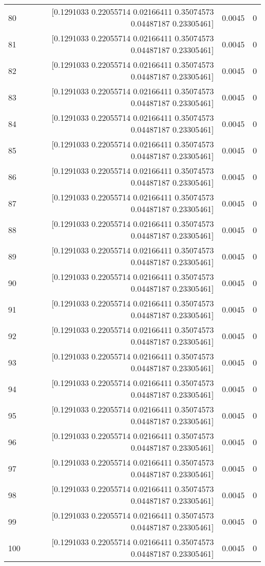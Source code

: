 \begin{longtable}{lrrr}
80 & [0.1291033  0.22055714 0.02166411 0.35074573 0.04487187 0.23305461] & 0.0045 & 0 \\
81 & [0.1291033  0.22055714 0.02166411 0.35074573 0.04487187 0.23305461] & 0.0045 & 0 \\
82 & [0.1291033  0.22055714 0.02166411 0.35074573 0.04487187 0.23305461] & 0.0045 & 0 \\
83 & [0.1291033  0.22055714 0.02166411 0.35074573 0.04487187 0.23305461] & 0.0045 & 0 \\
84 & [0.1291033  0.22055714 0.02166411 0.35074573 0.04487187 0.23305461] & 0.0045 & 0 \\
85 & [0.1291033  0.22055714 0.02166411 0.35074573 0.04487187 0.23305461] & 0.0045 & 0 \\
86 & [0.1291033  0.22055714 0.02166411 0.35074573 0.04487187 0.23305461] & 0.0045 & 0 \\
87 & [0.1291033  0.22055714 0.02166411 0.35074573 0.04487187 0.23305461] & 0.0045 & 0 \\
88 & [0.1291033  0.22055714 0.02166411 0.35074573 0.04487187 0.23305461] & 0.0045 & 0 \\
89 & [0.1291033  0.22055714 0.02166411 0.35074573 0.04487187 0.23305461] & 0.0045 & 0 \\
90 & [0.1291033  0.22055714 0.02166411 0.35074573 0.04487187 0.23305461] & 0.0045 & 0 \\
91 & [0.1291033  0.22055714 0.02166411 0.35074573 0.04487187 0.23305461] & 0.0045 & 0 \\
92 & [0.1291033  0.22055714 0.02166411 0.35074573 0.04487187 0.23305461] & 0.0045 & 0 \\
93 & [0.1291033  0.22055714 0.02166411 0.35074573 0.04487187 0.23305461] & 0.0045 & 0 \\
94 & [0.1291033  0.22055714 0.02166411 0.35074573 0.04487187 0.23305461] & 0.0045 & 0 \\
95 & [0.1291033  0.22055714 0.02166411 0.35074573 0.04487187 0.23305461] & 0.0045 & 0 \\
96 & [0.1291033  0.22055714 0.02166411 0.35074573 0.04487187 0.23305461] & 0.0045 & 0 \\
97 & [0.1291033  0.22055714 0.02166411 0.35074573 0.04487187 0.23305461] & 0.0045 & 0 \\
98 & [0.1291033  0.22055714 0.02166411 0.35074573 0.04487187 0.23305461] & 0.0045 & 0 \\
99 & [0.1291033  0.22055714 0.02166411 0.35074573 0.04487187 0.23305461] & 0.0045 & 0 \\
100 & [0.1291033  0.22055714 0.02166411 0.35074573 0.04487187 0.23305461] & 0.0045 & 0 \\

\end{longtable}
